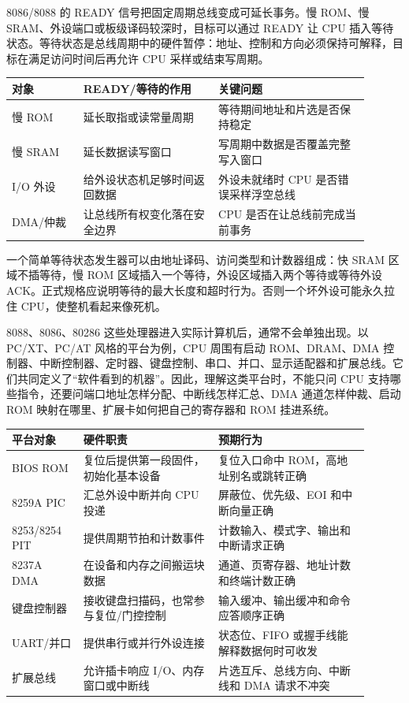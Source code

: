 8086/8088 的 READY 信号把固定周期总线变成可延长事务。慢 ROM、慢 SRAM、外设端口或板级译码较深时，目标可以通过 READY 让 CPU 插入等待状态。等待状态是总线周期中的硬件暂停：地址、控制和方向必须保持可解释，目标在满足访问时间后再允许 CPU 采样或结束写周期。

\begin{longtable}{L{0.18\linewidth}L{0.34\linewidth}L{0.38\linewidth}}
\toprule
对象 & READY/等待的作用 & 关键问题 \\
\midrule
慢 ROM & 延长取指或读常量周期 & 等待期间地址和片选是否保持稳定 \\
慢 SRAM & 延长数据读写窗口 & 写周期中数据是否覆盖完整写入窗口 \\
I/O 外设 & 给外设状态机足够时间返回数据 & 外设未就绪时 CPU 是否错误采样浮空总线 \\
DMA/仲裁 & 让总线所有权变化落在安全边界 & CPU 是否在让总线前完成当前事务 \\
\bottomrule
\end{longtable}

一个简单等待状态发生器可以由地址译码、访问类型和计数器组成：快 SRAM 区域不插等待，慢 ROM 区域插入一个等待，外设区域插入两个等待或等待外设 ACK。正式规格应说明等待的最大长度和超时行为。否则一个坏外设可能永久拉住 CPU，使整机看起来像死机。

8088、8086、80286 这些处理器进入实际计算机后，通常不会单独出现。以 PC/XT、PC/AT 风格的平台为例，CPU 周围有启动 ROM、DRAM、DMA 控制器、中断控制器、定时器、键盘控制、串口、并口、显示适配器和扩展总线。它们共同定义了“软件看到的机器”。因此，理解这类平台时，不能只问 CPU 支持哪些指令，还要问端口地址怎样分配、中断线怎样汇总、DMA 通道怎样仲裁、启动 ROM 映射在哪里、扩展卡如何把自己的寄存器和 ROM 挂进系统。

\begin{longtable}{L{0.18\linewidth}L{0.34\linewidth}L{0.38\linewidth}}
\toprule
平台对象 & 硬件职责 & 预期行为 \\
\midrule
BIOS ROM & 复位后提供第一段固件，初始化基本设备 & 复位入口命中 ROM，高地址别名或跳转正确 \\
8259A PIC & 汇总外设中断并向 CPU 投递 & 屏蔽位、优先级、EOI 和中断向量正确 \\
8253/8254 PIT & 提供周期节拍和计数事件 & 计数输入、模式字、输出和中断请求正确 \\
8237A DMA & 在设备和内存之间搬运块数据 & 通道、页寄存器、地址计数和终端计数正确 \\
键盘控制器 & 接收键盘扫描码，也常参与复位/门控控制 & 输入缓冲、输出缓冲和命令应答顺序正确 \\
UART/并口 & 提供串行或并行外设连接 & 状态位、FIFO 或握手线能解释数据何时可收发 \\
扩展总线 & 允许插卡响应 I/O、内存窗口或中断线 & 片选互斥、总线方向、中断线和 DMA 请求不冲突 \\
\bottomrule
\end{longtable}

